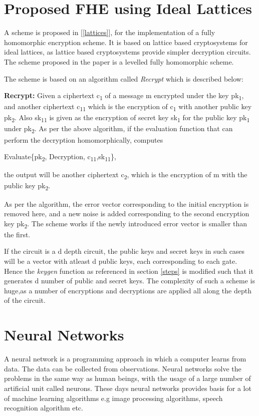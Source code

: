 \section{Proposed FHE using Ideal Lattices} \label{FHE}
A scheme is proposed in [\ref{lattices}], for the implementation of a fully homomorphic encryption scheme. It is based on lattice based cryptosystems for ideal lattices, as lattice based cryptosystems provide simpler decryption circuits. The scheme proposed in the paper is a levelled fully homomorphic scheme.

 \noindent The scheme is based on an algorithm called \textit{Recrypt} which is described below:
 
\vspace{0.25cm} \label{refresh}
\noindent \textbf{Recrypt:} Given a ciphertext c\textsubscript{1} of a message m encrypted under the key pk\textsubscript{1}, and another ciphertext c\textsubscript{11} which is the encryption of c\textsubscript{1} with another public key pk\textsubscript{2}. Also sk\textsubscript{11} is given as the encryption of secret key sk\textsubscript{1} for the public key pk\textsubscript{1} under pk\textsubscript{2}. As per the above algorithm,
if the evaluation function that can perform the decryption homomorphically, computes


\hspace{3cm} Evaluate\{pk\textsubscript{2}, Decryption, c\textsubscript{11},sk\textsubscript{11}\},

 \noindent the output will be another ciphertext c\textsubscript{2}, which is the encryption of m with the public key pk\textsubscript{2}. 
 
 \noindent As per the algorithm, the error vector corresponding to the initial encryption is removed here, and a new noise is added corresponding to the second encryption key pk\textsubscript{2}. The scheme works if the newly introduced error vector is smaller than the first.

 \noindent If the circuit is a d depth circuit, the public keys and secret keys in such cases will be a vector with atleast d public keys, each corresponding to each gate. 
Hence the \textit{keygen} function as referenced in section \ref{steps} is modified such that it generates d number of public and secret keys.
The complexity of such a scheme is huge,as a number of encryptions and decryptions are applied all along the depth of the circuit.
\section{Neural Networks}
A neural network is a programming approach in which a computer learns from data. The data can be collected from observations. Neural networks solve the problems in the same way as human beings, with the usage of a large number of artificial unit called neurons. These days neural networks provides basis for a lot of machine learning algorithms e.g image processing algorithms, speech recognition algorithm etc.

